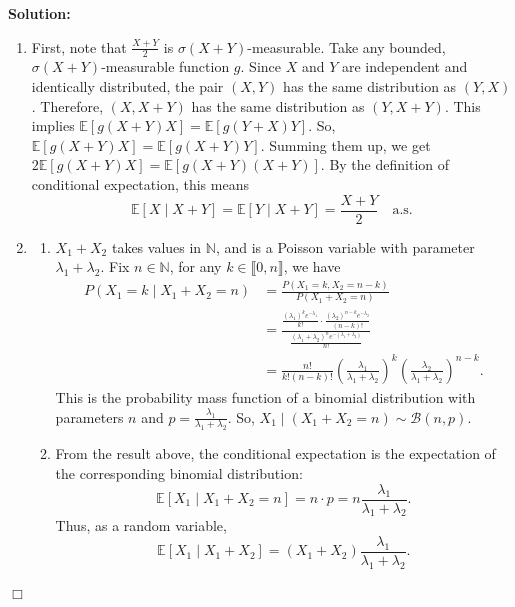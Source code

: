 \documentclass[12pt]{article}
\newenvironment{solution}{\vspace{0.2cm}\color{blue}\textbf{Solution:}}{\hfill\ensuremath{\Box}}
\begin{document}
\begin{solution}
\begin{enumerate}[label=\arabic*.]
    \item First, note that $\frac{X+Y}{2}$ is $\sigma(X+Y)$-measurable. Take any bounded, $\sigma(X+Y)$-measurable function $g$.
    Since $X$ and $Y$ are independent and identically distributed, the pair $(X, Y)$ has the same distribution as $(Y, X)$.
    Therefore, $(X, X+Y)$ has the same distribution as $(Y, X+Y)$.
    This implies $\mathbb{E}[g(X+Y)X] = \mathbb{E}[g(Y+X)Y]$.
    So, $\mathbb{E}[g(X+Y)X] = \mathbb{E}[g(X+Y)Y]$.
    Summing them up, we get $2\mathbb{E}[g(X+Y)X] = \mathbb{E}[g(X+Y)(X+Y)]$.
    By the definition of conditional expectation, this means
    \[\mathbb{E}[X \mid X+Y] = \mathbb{E}[Y \mid X+Y] = \frac{X+Y}{2} \quad \text{a.s.}\]

    \item 
    \begin{enumerate}[label=(\alph*)]
        \item $X_1 + X_2$ takes values in $\mathbb{N}$, and is a Poisson variable with parameter $\lambda_1 + \lambda_2$. Fix $n \in \mathbb{N}$, for any $k \in \llbracket 0, n \rrbracket$, we have
        \begin{align*}
        P(X_1 = k \mid X_1 + X_2 = n) 
        &= \frac{P(X_1 = k, X_2 = n - k)}{P(X_1 + X_2 = n)} \\
        &= \frac{\frac{(\lambda_1)^k e^{-\lambda_1}}{k!} \cdot \frac{(\lambda_2)^{n-k} e^{-\lambda_2}}{(n-k)!}}{\frac{(\lambda_1 + \lambda_2)^n e^{-(\lambda_1 + \lambda_2)}}{n!}} \\
        &= \frac{n!}{k!(n-k)!} \left(\frac{\lambda_1}{\lambda_1 + \lambda_2}\right)^k \left(\frac{\lambda_2}{\lambda_1 + \lambda_2}\right)^{n-k}.
        \end{align*}
        This is the probability mass function of a binomial distribution with parameters $n$ and $p = \frac{\lambda_1}{\lambda_1 + \lambda_2}$. So, $X_1 \mid (X_1+X_2=n) \sim \mathcal{B}(n, p)$.

        \item From the result above, the conditional expectation is the expectation of the corresponding binomial distribution:
        \[\mathbb{E}[X_1 \mid X_1 + X_2 = n] = n \cdot p = n \frac{\lambda_1}{\lambda_1 + \lambda_2}.\]
        Thus, as a random variable,
        \[\mathbb{E}[X_1 \mid X_1 + X_2] = (X_1+X_2) \frac{\lambda_1}{\lambda_1 + \lambda_2}.\]
    \end{enumerate}


\end{enumerate}
\end{solution}
\end{document}
